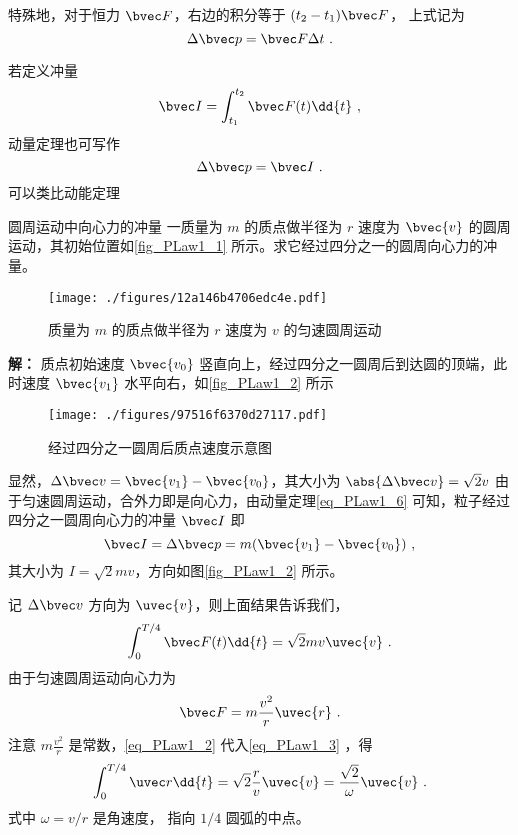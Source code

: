 特殊地，对于恒力 $\bvec F$，右边的积分等于 $(t_2-t_1)\bvec F$， 上式记为
\begin{equation}\label{eq_PLaw1_1}
\Delta \bvec p = \bvec F \Delta t~.
\end{equation}

若定义冲量
\begin{equation}
\bvec I=\int_{t_1}^{t_2}\bvec F(t) \dd{t}~,
\end{equation}
动量定理也可写作
\begin{equation}
\Delta \bvec p = \bvec I~.
\end{equation}
可以类比动能定理

\begin{example}{圆周运动中向心力的冲量}
一质量为 $m$ 的质点做半径为 $r$ 速度为 $\bvec{v}$ 的圆周运动，其初始位置如\autoref{fig_PLaw1_1} 所示。求它经过四分之一的圆周向心力的冲量。
\begin{figure}[ht]
\centering
\texttt{[image: ./figures/12a146b4706edc4e.pdf]}
\caption{质量为 $m$ 的质点做半径为 $r$ 速度为 $v$ 的匀速圆周运动} \label{fig_PLaw1_1}
\end{figure}
\textbf{解：} 质点初始速度 $\bvec{v_0}$ 竖直向上，经过四分之一圆周后到达圆的顶端，此时速度 $\bvec{v_1}$ 水平向右，如\autoref{fig_PLaw1_2} 所示
\begin{figure}[ht]
\centering
\texttt{[image: ./figures/97516f6370d27117.pdf]}
\caption{经过四分之一圆周后质点速度示意图} \label{fig_PLaw1_2}
\end{figure}
显然，$\Delta\bvec v=\bvec{v_1}-\bvec{v_0}$，其大小为 $\abs{\Delta\bvec v}=\sqrt{2}v$ 由于匀速圆周运动，合外力即是向心力，由动量定理\autoref{eq_PLaw1_6}  可知，粒子经过四分之一圆周向心力的冲量 $\bvec I$ 即
\begin{equation}
\bvec I=\Delta\bvec p=m(\bvec{v_1}-\bvec{v_0})~,
\end{equation}
其大小为 $I=\sqrt{2}mv$，方向如图\autoref{fig_PLaw1_2} 所示。

记 $\Delta\bvec v$ 方向为 $\uvec{v}$，则上面结果告诉我们，
\begin{equation}\label{eq_PLaw1_3}
\int_{0}^{T/4}\bvec F(t) \dd{t}=\sqrt{2}mv\uvec{v}~.
\end{equation}
由于匀速圆周运动向心力为
\begin{equation}\label{eq_PLaw1_2}
\bvec F=m\frac{v^2}{r}\uvec{r}~.
\end{equation}
注意 $m\frac{v^2}{r}$ 是常数，\autoref{eq_PLaw1_2} 代入\autoref{eq_PLaw1_3} ，得
\begin{equation}\label{eq_PLaw1_5}
\int_{0}^{T/4}\uvec r \dd{t}=\sqrt{2}\frac{r}{v}\uvec{v}=\frac{\sqrt{2}}{\omega}\uvec{v}~.
\end{equation}
式中 $\omega={v}/{r}$ 是角速度， 指向 $1/4$ 圆弧的中点。


\end{example}
